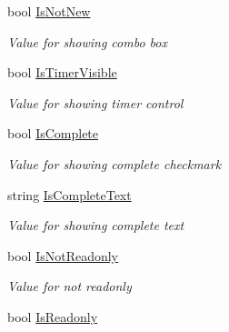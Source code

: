 \begin{DoxyCompactItemize}
bool \hyperlink{class_field_service_1_1_win_r_t_1_1_view_models_1_1_assignment_view_model_a4960315eeec6032ef59341646940920e}{Is\+Not\+New}
\begin{DoxyCompactList}\small\item\em Value for showing combo box \end{DoxyCompactList}\item 
bool \hyperlink{class_field_service_1_1_win_r_t_1_1_view_models_1_1_assignment_view_model_a2c14fea75267dfdd206b8f4ce5422b6b}{Is\+Timer\+Visible}
\begin{DoxyCompactList}\small\item\em Value for showing timer control \end{DoxyCompactList}\item 
bool \hyperlink{class_field_service_1_1_win_r_t_1_1_view_models_1_1_assignment_view_model_a5bb165d5999e50fc6df6b6e2d12df53b}{Is\+Complete}
\begin{DoxyCompactList}\small\item\em Value for showing complete checkmark \end{DoxyCompactList}\item 
string \hyperlink{class_field_service_1_1_win_r_t_1_1_view_models_1_1_assignment_view_model_a2517548d00d5da3878b6cdea3227ef90}{Is\+Complete\+Text}
\begin{DoxyCompactList}\small\item\em Value for showing complete text \end{DoxyCompactList}\item 
bool \hyperlink{class_field_service_1_1_win_r_t_1_1_view_models_1_1_assignment_view_model_afe2d5158719ba570a4f8ceec30e59a5f}{Is\+Not\+Readonly}
\begin{DoxyCompactList}\small\item\em Value for not readonly \end{DoxyCompactList}\item 
bool \hyperlink{class_field_service_1_1_win_r_t_1_1_view_models_1_1_assignment_view_model_a2e932ae8b3a86db00c7c81897ca205de}{Is\+Readonly}

\end{DoxyCompactItemize}

